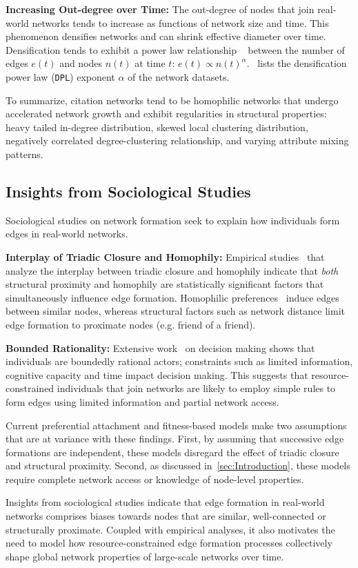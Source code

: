 \textbf{Increasing Out-degree over Time:}
The out-degree of nodes that join real-world networks tends to increase as
functions of network size and time. This phenomenon densifies networks and
can shrink effective diameter over time. Densification tends to exhibit a power law
relationship ~\cite{leskovec2005graphs} between the number of edges $e(t)$ and
nodes $n(t)$ at time $t$: $e(t) \propto n(t)^{\alpha}$.~
lists the densification power law (\texttt{DPL}) exponent $\alpha$ of the
network datasets.

To summarize, citation networks tend to be homophilic networks that undergo
accelerated network growth and exhibit regularities in structural properties:
heavy tailed in-degree distribution, skewed local clustering distribution,
negatively correlated degree-clustering relationship, and varying attribute
mixing patterns.

\subsection{Insights from Sociological Studies}

Sociological studies on network formation seek to explain
how individuals form edges in real-world networks.

\textbf{Interplay of Triadic Closure and Homophily:}
Empirical studies~\cite{35626,block2014multidimensional} that analyze the
interplay between triadic closure and homophily
  indicate
that \textit{both} structural proximity and homophily are statistically
significant factors that simultaneously influence edge formation.
Homophilic preferences~\cite{mcpherson2001birds} induce edges between similar
nodes, whereas structural factors such as network distance limit
edge formation to proximate nodes (e.g. friend of a
friend).

\textbf{Bounded Rationality:}
Extensive work~\cite{simon1972theories,gigerenzer1996reasoning,lipman1995information} on
decision making shows that individuals are boundedly rational
actors; constraints such as limited information, cognitive capacity and time impact decision making.
This suggests that resource-constrained individuals that join networks are likely to employ simple rules
to form edges using limited information and partial network access.


Current preferential attachment and fitness-based models
\cite{dorogovtsev2000structure,singh2017relay,barabasi1999emergence}
make two assumptions that are at variance with these findings.
First, by assuming that successive edge formations are independent,
these models disregard the effect of triadic closure and structural proximity.
Second, as discussed in~\cref{sec:Introduction}, these models require complete network
access or knowledge of node-level properties.

Insights from sociological studies indicate that edge formation in real-world
networks comprises biases towards nodes that are similar, well-connected or
structurally proximate. Coupled with empirical analyses, it also motivates
the need to model how resource-constrained edge formation processes collectively
shape global network properties of large-scale networks over time.
